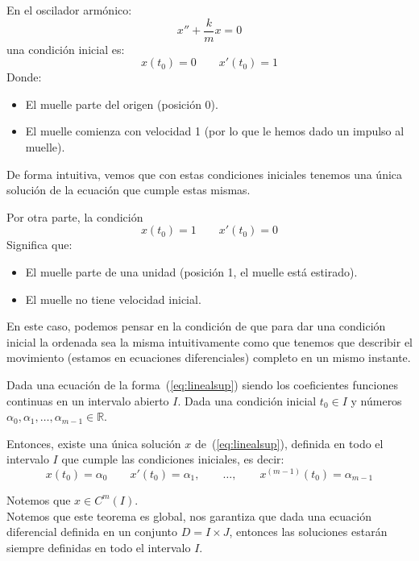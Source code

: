 \begin{ejemplo}
    En el oscilador armónico:
    \begin{equation*}
        x'' + \dfrac{k}{m}x = 0
    \end{equation*}
    una condición inicial es:
    \begin{equation*}
        x(t_0) = 0 \qquad x'(t_0) = 1
    \end{equation*}
    Donde:
    \begin{itemize}
        \item El muelle parte del origen (posición 0).
        \item El muelle comienza con velocidad 1 (por lo que le hemos dado un impulso al muelle).
    \end{itemize}
    De forma intuitiva, vemos que con estas condiciones iniciales tenemos una única solución de la ecuación que cumple estas mismas.

    Por otra parte, la condición
    \begin{equation*}
        x(t_0) = 1 \qquad x'(t_0) = 0
    \end{equation*}
    Significa que:
    \begin{itemize}
        \item El muelle parte de una unidad (posición 1, el muelle está estirado).
        \item El muelle no tiene velocidad inicial.
    \end{itemize}

    En este caso, podemos pensar en la condición de que para dar una condición inicial la ordenada sea la misma intuitivamente como que tenemos que describir el movimiento (estamos en ecuaciones diferenciales) completo en un mismo instante.
\end{ejemplo}

\begin{teo}\label{teo:existencia_unicidad}
    Dada una ecuación de la forma~(\ref{eq:linealsup}) siendo los coeficientes funciones continuas en un intervalo abierto $I$. Dada una condición inicial $t_0\in I$ y números $\alpha_0, \alpha_1,\ldots, \alpha_{m-1}\in \mathbb{R}$.

    Entonces, existe una única solución $x$ de~(\ref{eq:linealsup}), definida en todo el intervalo $I$ que cumple las condiciones iniciales, es decir:
    \begin{equation*}
        x(t_0) = \alpha_0 \qquad x'(t_0) = \alpha_1,\qquad  \ldots, \qquad  x^{(m-1)}(t_0) = \alpha_{m-1}
    \end{equation*}
\end{teo}
Notemos que $x\in C^m(I)$.\\
Notemos que este teorema es global, nos garantiza que dada una ecuación diferencial definida en un conjunto $D=I\times J$, entonces las soluciones estarán siempre definidas en todo el intervalo $I$.\\

